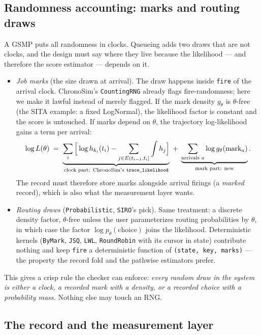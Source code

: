 \documentclass[11pt]{article}
\newcommand{\code}[1]{\texttt{#1}}
\begin{document}
\subsection{Randomness accounting: marks and routing draws}
\label{sec:randomness}

A GSMP puts all randomness in clocks. Queueing adds two draws that are not
clocks, and the design must say where they live because the likelihood --- and
therefore the score estimator --- depends on it.

\begin{itemize}
\item \emph{Job marks} (the size drawn at arrival). The draw happens inside
  \code{fire} of the arrival clock. ChronoSim's \code{CountingRNG} already
  flags fire-randomness; here we make it lawful instead of merely flagged. If
  the mark density $g_\theta$ is $\theta$-free (the SITA example: a fixed
  LogNormal), the likelihood factor is constant and the score is untouched.
  If marks depend on $\theta$, the trajectory log-likelihood gains a term per
  arrival:
  \[
  \log L(\theta) \;=\;
  \underbrace{\sum_i \Big[ \log h_{k_i}(t_i)
    - \sum_{j \in E(t_{i-1},t_i]} \int h_j \Big]}_{\text{clock part: ChronoSim's \code{trace\_likelihood}}}
  \;+\;
  \underbrace{\sum_{\text{arrivals } a} \log g_\theta(\text{mark}_a)}_{\text{mark part: new}} .
  \]
  The record must therefore store marks alongside arrival firings (a
  \emph{marked} record), which is also what the measurement layer wants.
\item \emph{Routing draws} (\code{Probabilistic}, \code{SIRO}'s pick). Same
  treatment: a discrete density factor, $\theta$-free unless the user
  parameterizes routing probabilities by $\theta$, in which case the factor
  $\log p_\theta(\text{choice})$ joins the likelihood. Deterministic kernels
  (\code{ByMark}, \code{JSQ}, \code{LWL}, \code{RoundRobin} with its cursor in
  state) contribute nothing and keep \code{fire} a deterministic function of
  \code{(state, key, marks)} --- the property the record fold and the pathwise
  estimators prefer.
\end{itemize}

This gives a crisp rule the checker can enforce: \emph{every random draw in
the system is either a clock, a recorded mark with a density, or a recorded
choice with a probability mass.} Nothing else may touch an RNG.

\subsection{The record and the measurement layer}
\label{sec:measurement}
\end{document}
